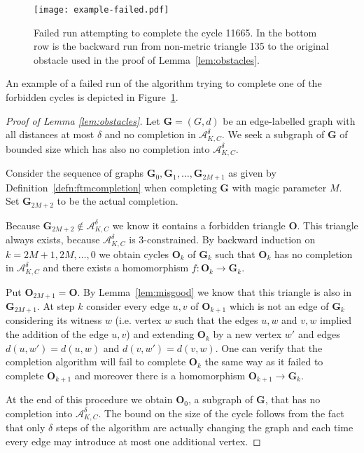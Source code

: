 \documentclass[11pt]{amsart}
\def\str#1{\mathbf {#1}}
\begin{document}
\begin{example}
\begin{figure}
\centering
\texttt{[image: example-failed.pdf]}
\caption{Failed run attempting to complete the cycle 11665. In the bottom row is the backward run from non-metric triangle 135 to the original obstacle used in the proof of Lemma~\ref{lem:obstacles}.}
\label{fig:11665}
\end{figure}%
An example of a failed run of the algorithm trying to complete one of the forbidden cycles is depicted in Figure~\ref{fig:11665}.
\end{example}

\begin{proof}[Proof of Lemma \ref{lem:obstacles}]
Let $\str{G}=(G,d)$ be an edge-labelled graph with all distances at most $\delta$ and no completion in
$\mathcal A^\delta_{K,C}$.  We seek a subgraph of $\str{G}$ of bounded size
which has also no completion into $\mathcal A^\delta_{K,C}$.

Consider the sequence of graphs $\str{G}_0, \str{G}_1,\dots,\str{G}_{2M+1}$ as given by Definition~\ref{defn:ftmcompletion}
when completing $\str{G}$ with magic parameter $M$.  Set $\str{G}_{2M+2}$ to be the actual completion.

Because $\str{G}_{2M+2}\notin \mathcal A^\delta_{K,C}$ we know it contains a forbidden triangle $\str{O}$.
This triangle always exists, because $\mathcal A^\delta_{K,C}$ is 3-constrained.
By backward induction on $k=2M+1,2M,\dots, 0$ we obtain cycles $\str{O}_k$
of $\str{G}_k$ such that $\str{O}_k$ has no completion in $\mathcal A^\delta_{K,C}$
and there exists a homomorphism $f\colon \str{O}_k\to \str{G}_k$.

Put $\str{O}_{2M+1}=\str{O}$. By Lemma~\ref{lem:misgood} we know that this triangle is also in $\str{G}_{2M+1}$.
At step $k$ consider every edge $u,v$ of $\str{O}_{k+1}$ which is not an edge of $\str{G}_k$ considering
its witness $w$ (i.e. vertex $w$ such that the edges $u,w$ and $v,w$ implied the addition of the edge $u,v$) and extending
$\str{O}_k$ by a new vertex $w'$ and edges $d(u,w')=d(u,w)$ and $d(v,w')=d(v,w)$.
One can verify that the completion algorithm will fail to complete $\str{O}_k$ the same way
as it failed to complete $\str{O}_{k+1}$ and moreover there is a homomorphism $\str{O}_{k+1}\to \str{G}_k$.

At the end of this procedure we obtain $\str{O}_0$, a subgraph of $\str{G}$, that
has no completion into $\mathcal A^\delta_{K,C}$.
The bound on the size of the cycle follows from the fact that only $\delta$ steps
of the algorithm are actually changing the graph and each time every edge may
introduce at most one additional vertex.


\end{proof}
\end{document}
